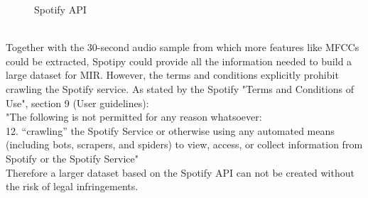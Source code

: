 \begin{figure}[htbp]
	\centering
	\caption{Spotify API}
	\label{fig:spotify}
\end{figure}
\FloatBarrier
\ \\
Together with the 30-second audio sample from which more features like MFCCs could be extracted, Spotipy could provide all the information needed to build a large dataset for MIR. However, the terms and conditions explicitly prohibit crawling the Spotify service. As stated by the Spotify "Terms and Conditions of Use", section 9 (User guidelines):\\
"The following is not permitted for any reason whatsoever:\newline
[...]\\
12. “crawling” the Spotify Service or otherwise using any automated means (including bots, scrapers, and spiders) to view, access, or collect information from Spotify or the Spotify Service" \cite{spottac1}\\
Therefore a larger dataset based on the Spotify API can not be created without the risk of legal infringements. %
